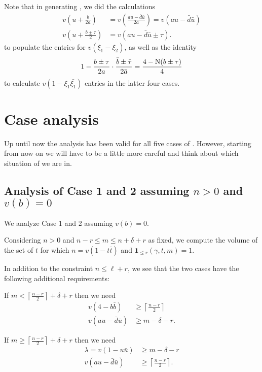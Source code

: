Note that in generating , we did the calculations
\begin{align*}
  v\left( u + \frac{b}{2a} \right)
  &= v\left( \frac{au-\bar d \bar u}{2a} \right)
  = v(au - \bar d \bar u) \\
  v\left( u + \frac{b \pm \tau}{2} \right)
  &= v(au - \bar d \bar u \pm \tau).
\end{align*}
to populate the entries for $v(\xi_1 - \xi_2)$,
as well as the identity
\[ 1 - \frac{b \pm \tau}{2a} \cdot \frac{\bar b \pm \bar \tau}{2\bar a}
= \frac{4 - \operatorname{N}(b \pm \tau)}{4} \]
to calculate $v(1-\xi_1\bar{\xi_1})$ entries in the latter four cases.

\section{Case analysis}
Up until now the analysis has been valid for all five cases of
.
However, starting from now on we will have to be a little more careful
and think about which situation of  we are in.

\subsection{Analysis of Case 1 and 2 assuming $n > 0$ and $v(b) = 0$}
We analyze Case 1 and 2 assuming $v(b) = 0$.

Considering $n > 0$ and $n-r \le m \le n+\delta+r$ as fixed,
we compute the volume of the set of $t$
for which $n = v(1-t\bar t)$ and $\mathbf{1}_{\le r}(\gamma,t,m) = 1$.

In addition to the constraint $n \le \ell + r$,
we see that the two cases have the following additional requirements:
\begin{description}
  \ii[Case 1] If $m < \left\lceil \frac{n-r}{2} \right\rceil + \delta + r$ then we need
  \begin{align}
    v(4-b\bar b) &\ge \left\lceil \frac{n-r}{2} \right\rceil \label{eq:odd_ineq1} \\
    v(au - \bar d \bar u) &\ge m - \delta - r \label{eq:odd_ineq2}.
  \end{align}

  \ii[Case 2] If $m \geq \left\lceil \frac{n-r}{2} \right\rceil + \delta + r$ then we need
  \begin{align}
    \lambda = v(1-u \bar u) &\ge m-\delta-r \label{eq:odd_ineq3} \\
    v(au - \bar d \bar u) &\ge \left\lceil \frac{n-r}{2} \right\rceil \label{eq:odd_ineq4}.
  \end{align}
\end{description}

